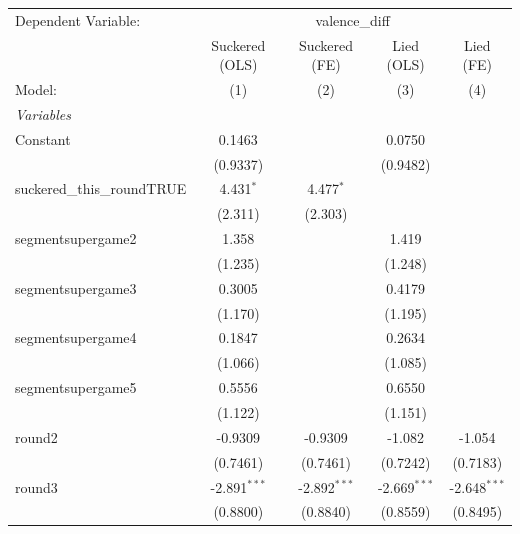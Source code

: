 
\begingroup
\centering
\begin{tabular}{lcccc}
   \tabularnewline \midrule \midrule
   Dependent Variable: & \multicolumn{4}{c}{valence\_diff}\\
                                & Suckered (OLS) & Suckered (FE)  & Lied (OLS)     & Lied (FE) \\   
   Model:                       & (1)            & (2)            & (3)            & (4)\\  
   \midrule
   \emph{Variables}\\
   Constant                     & 0.1463         &                & 0.0750         &   \\   
                                & (0.9337)       &                & (0.9482)       &   \\   
   suckered\_this\_roundTRUE    & 4.431$^{*}$    & 4.477$^{*}$    &                &   \\   
                                & (2.311)        & (2.303)        &                &   \\   
   segmentsupergame2            & 1.358          &                & 1.419          &   \\   
                                & (1.235)        &                & (1.248)        &   \\   
   segmentsupergame3            & 0.3005         &                & 0.4179         &   \\   
                                & (1.170)        &                & (1.195)        &   \\   
   segmentsupergame4            & 0.1847         &                & 0.2634         &   \\   
                                & (1.066)        &                & (1.085)        &   \\   
   segmentsupergame5            & 0.5556         &                & 0.6550         &   \\   
                                & (1.122)        &                & (1.151)        &   \\   
   round2                       & -0.9309        & -0.9309        & -1.082         & -1.054\\   
                                & (0.7461)       & (0.7461)       & (0.7242)       & (0.7183)\\   
   round3                       & -2.891$^{***}$ & -2.892$^{***}$ & -2.669$^{***}$ & -2.648$^{***}$\\   
                                & (0.8800)       & (0.8840)       & (0.8559)       & (0.8495)\\   

\end{tabular}
